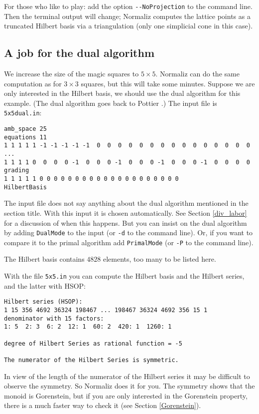 \documentclass[12pt,a4paper]{scrartcl}
\theoremstyle{definition}
\def\ttt{\texttt}
\begin{document}
 For those who like to play: add the option \verb|--NoProjection| to the command line. Then the terminal output will change; Normaliz computes the lattice points as a truncated Hilbert basis via a triangulation (only one simplicial cone in this case).

\subsection{A job for the dual algorithm}\label{job_dual}

We increase the size of the magic squares to $5\times 5$. Normaliz can do the same computation as for $3\times 3$ squares, but this will take some minutes. Suppose we are only interested in the Hilbert basis, we should use the dual algorithm for this example. (The dual algorithm goes back to Pottier \cite{Po}.) The input file is \ttt{5x5dual.in}:

\begin{Verbatim}
amb_space 25
equations 11
1 1 1 1 1 -1 -1 -1 -1 -1  0  0  0  0  0  0  0  0  0  0  0  0  0  0  0
...
1 1 1 1 0  0  0  0 -1  0  0  0 -1  0  0  0 -1  0  0  0 -1  0  0  0  0
grading
1 1 1 1 1 0 0 0 0 0 0 0 0 0 0 0 0 0 0 0 0 0 0 0 0
HilbertBasis
\end{Verbatim}
The input file does not say anything about the dual algorithm mentioned in the section title. With this input it is chosen automatically. See Section \ref{div_labor} for a discussion of when this happens. But you can insist on the dual algorithm by adding \verb|DualMode| to the input (or \verb|-d| to the command line). Or, if you want to compare it to the primal algorithm add \verb|PrimalMode| (or \verb|-P| to the command line).


The Hilbert basis contains $4828$ elements, too many to be listed here.

With the file \verb|5x5.in| you can compute the Hilbert basis and the Hilbert series, and the latter with HSOP:
\begin{Verbatim}
Hilbert series (HSOP):
1 15 356 4692 36324 198467 ... 198467 36324 4692 356 15 1 
denominator with 15 factors:
1: 5  2: 3  6: 2  12: 1  60: 2  420: 1  1260: 1  

degree of Hilbert Series as rational function = -5

The numerator of the Hilbert Series is symmetric.
\end{Verbatim}
In view of the length of the numerator of the Hilbert series it may be difficult to observe the symmetry. So Normaliz does it for you.  The symmetry shows that the monoid is Gorenstein, but if you are only interested in the Gorenstein property, there is a much faster way to check it (see Section \ref{Gorenstein}).
\end{document}
